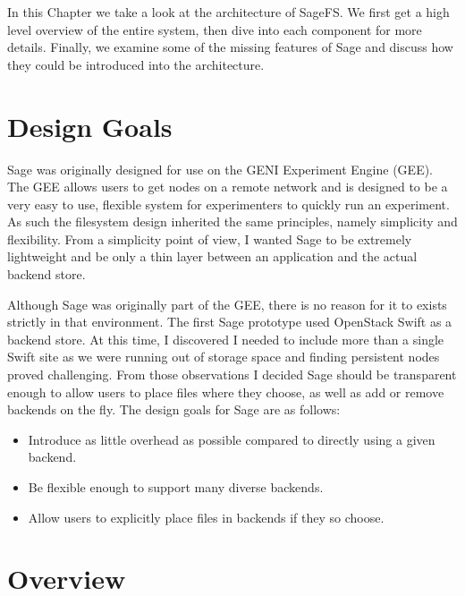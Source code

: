 \label{chapter:arch}


In this Chapter we take a look at the architecture of SageFS. We first get a high level overview of the entire system, then dive into each component for more details. Finally, we examine some of the missing features of Sage and discuss how they could be introduced into the architecture.

\section{Design Goals}

Sage was originally designed for use on the GENI Experiment Engine (GEE). The GEE allows users to get nodes on a remote network and is designed to be a very easy to use, flexible system for experimenters to quickly run an experiment. As such the filesystem design inherited the same principles, namely simplicity and flexibility. From a simplicity point of view, I wanted Sage to be extremely lightweight and be only a thin layer between an application and the actual backend store.

Although Sage was originally part of the GEE, there is no reason for it to exists strictly in that environment. The first Sage prototype used OpenStack Swift as a backend store. At this time, I discovered I needed to include more than a single Swift site as we were running out of storage space and finding persistent nodes proved challenging. From those observations I decided Sage should be transparent enough to allow users to place files where they choose, as well as add or remove backends on the fly. The design goals for Sage are as follows:

\begin{itemize}
\item Introduce as little overhead as possible compared to directly using a given backend.

\item Be flexible enough to support many diverse backends.

\item Allow users to explicitly place files in backends if they so choose.
\end{itemize}


\section{Overview}

